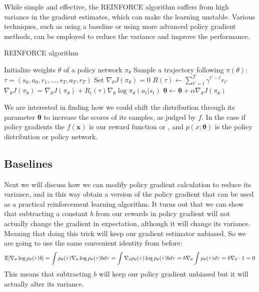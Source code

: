 While simple and effective, the REINFORCE algorithm suffers from high variance in the gradient estimates, which can make the learning unstable. Various techniques, such as using a baseline or using more advanced policy gradient methods, can be employed to reduce the variance and improve the performance.


\begin{algorithm}
\caption{REINFORCE algorithm}
\begin{algorithmic}[1]
\Require Initialize weights $\theta$ of a policy network $\pi_{\theta}$
    \State Sample a trajectory following $\pi(\theta)$: $\tau = (s_0, a_0, r_1, ..., s_{T}, a_{T}, r_T)$
    \State Set $\nabla_{\theta} J(\pi_{\theta}) = 0$
        \State $R(\tau) \leftarrow \sum_{t'=t}^T \gamma^{t'-t} r_{t'}$
        \State $\nabla_{\theta} J(\pi_{\theta}) = \nabla_{\theta} J(\pi_{\theta}) + R_{t} (\tau) \nabla_{\theta} \log \pi_{\theta}(a_t|s_t)$
    \EndFor
    \State$ \boldsymbol{\theta} \leftarrow \boldsymbol{\theta} + \alpha \nabla_{\theta} J(\pi_{\theta})$
\EndFor
\end{algorithmic}
\end{algorithm}

We are interested in finding how we could shift the distribution through its parameter $\boldsymbol{\theta}$ to increase the scores of its samples, as judged by $f$. In the case if policy gradients the $f(\boldsymbol{x})$ is our reward function or , and $p(x;\boldsymbol{\theta})$ is the policy distribution or policy network.

\subsection{Baselines}
Next we will discuss how we can modify policy gradient calculation to reduce its variance, and in this way obtain a version of the policy gradient that can be used as a practical reinforcement learning algorithm. 
It turns out that we can show that subtracting a constant $b$ from our rewards in policy gradient will not actually change the gradient in expectation, although it will change its variance. Meaning that doing this trick will keep our gradient estimator  unbiased. 
So we are going to use the same convenient identity from before:
$$
\mathbb E[ \nabla_{\theta} \log p_{\theta}(\tau) b] = \int p_{\theta}(\tau) \nabla_{\theta}\log p_{\theta}(\tau) b d \tau = \int \nabla_{\theta} p_{\theta}(\tau) \log p_{\theta}(\tau) b d \tau = 
 b \nabla_{\theta} \int p_{\theta}(\tau) d \tau =   b \nabla_{\theta}  \cdot 1 = 0
$$
This means that subtracting $b$ will keep our policy gradient unbiased but it will actually alter its variance. 




